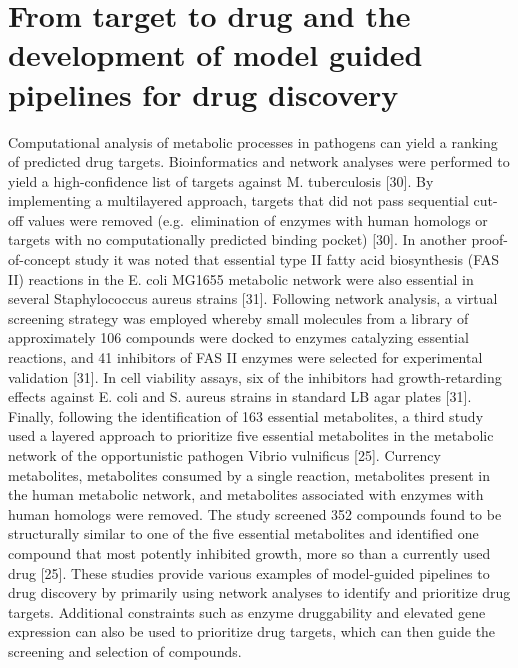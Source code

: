 \section{From target to drug and the development of 
         model guided pipelines for drug discovery}
Computational analysis of metabolic processes in pathogens can 
yield a ranking of predicted drug targets. Bioinformatics and 
network analyses were performed to yield a high-confidence list 
of targets against M. tuberculosis [30]. By implementing a 
multilayered approach, targets that did not pass sequential 
cut-off values were removed (e.g.\ elimination of enzymes with 
human homologs or targets with no computationally predicted 
binding pocket) [30]. In another proof-of-concept study it 
was noted that essential type II fatty acid biosynthesis (FAS II) 
reactions in the E. coli MG1655 metabolic network were also 
essential in several Staphylococcus aureus strains [31]. Following 
network analysis, a virtual screening strategy was employed 
whereby small molecules from a library of approximately 106 
compounds were docked to enzymes catalyzing essential reactions, 
and 41 inhibitors of FAS II enzymes were selected for experimental 
validation [31]. In cell viability assays, six of the inhibitors 
had growth-retarding effects against E. coli and S. aureus 
strains in standard LB agar plates [31]. Finally, following 
the identification of 163 essential metabolites, a third study 
used a layered approach to prioritize five essential metabolites 
in the metabolic network of the opportunistic pathogen Vibrio 
vulnificus [25]. Currency metabolites, metabolites consumed by 
a single reaction, metabolites present in the human metabolic 
network, and metabolites associated with enzymes with human 
homologs were removed. The study screened 352 compounds found 
to be structurally similar to one of the five essential metabolites 
and identified one compound that most potently inhibited growth, 
more so than a currently used drug [25]. These studies provide 
various examples of model-guided pipelines to drug discovery by 
primarily using network analyses to identify and prioritize drug 
targets. Additional constraints such as enzyme druggability and 
elevated gene expression can also be used to prioritize drug 
targets, which can then guide the screening and selection of compounds.

